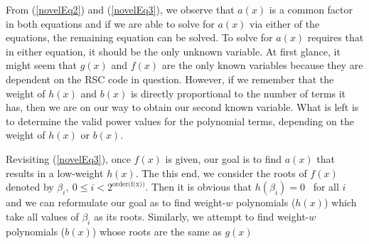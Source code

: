 From (\ref{novelEq2})  and (\ref{novelEq3}), we observe that $a(x)$ is a common factor in both equations and if we are able to solve for $a(x)$ via either of the equations, the remaining equation can be solved. To solve for $a(x)$ requires that in either equation, it should be the only unknown variable. At first glance, it might seem that $g(x)$ and $f(x)$ are the only known variables because they are dependent on the RSC code in question. However, if we remember that the weight of $h(x)$ and $b(x)$ is directly proportional to the number of terms it has, then we are on our way to obtain our second known variable. What is left is to determine the valid power values for the polynomial  terms, depending on the weight of $h(x)$ or $b(x)$.

Revisiting (\ref{novelEq3}), once $f(x)$ is given, our goal is to find $a(x)$ that results in a low-weight $h(x)$. The this end, we consider the roots of $f(x)$ denoted by $\beta_i,~ 0 \leq i < 2^{\text{order(f(x))}}$. Then it is obvious that $h(\beta_i)=0$~ for all $i$ and we can reformulate our goal as to find weight-$w$ polynomials ($h(x)$) which take all values of $\beta_i$ as its roots. Similarly, we attempt to find weight-$w$ polynomials ($b(x)$) whose roots are the same as $g(x)$

